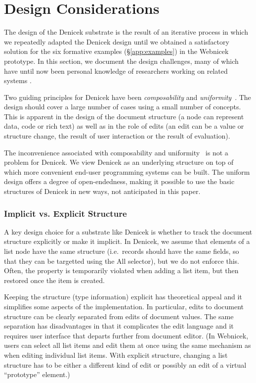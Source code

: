 \documentclass[sigconf,anonymous,screen]{acmart}
\newcommand{\ident}[1]{{\sffamily #1}}
\begin{document}

\section{Design Considerations}
\label{sec:discuss}

The design of the Denicek substrate is the result of an iterative process in which we repeatedly
adapted the Denicek design until we obtained a satisfactory solution for the six formative examples
(\S\ref{app:examples}) in the Webnicek prototype. In this section, we document the design challenges,
many of which have until now been personal knowledge of researchers working on related
systems \cite{jakubovic-2022-ladder,edwards-2005-subtext,hall-2017-infra,omar-2021-livelits}.

Two guiding principles for Denicek have been \emph{composability} and
\emph{uniformity}~\cite{jakubovic-2023-techdims}. The design should cover a large number of
cases using a small number of concepts. This is apparent in the design of the document
structure (a node can represent data, code or rich text) as well as in the role of edits
(an edit can be a value or structure change, the result of user interaction or the
result of evaluation).

The inconvenience associated with composability and uniformity~\cite{jakubovic-2023-techdims} is not
a problem for Denicek. We view Denicek as an underlying structure on top of which more
convenient end-user programming systems can be built. The uniform design offers a degree of open-endedness,
making it possible to use the basic structures of Denicek in new ways, not anticipated in this paper.

\subsubsection*{Implicit vs. Explicit Structure}
A key design choice for a substrate like Denicek is whether to track the document structure
explicitly or make it implicit. In Denicek, we assume that elements of a list node have the same
structure (i.e.~records should have the same fields, so that they can be targetted using the \ident{All}
selector), but we do not enforce this. Often, the property is temporarily violated when adding a
list item, but then restored once the item is created.

Keeping the structure (type information) explicit has theoretical appeal and it simplifies some
aspects of the implementation. In particular, edits to document structure can be clearly separated
from edits of document values. The same separation has disadvantages in that it complicates the
edit language and it requires user interface that departs further from document editor.
(In Webnicek, users can select all list items and edit them at once using the same mechanism as
when editing individual list items. With explicit structure, changing a list structure has to be
either a different kind of edit or possibly an edit of a virtual ``prototype'' element.)
\end{document}
